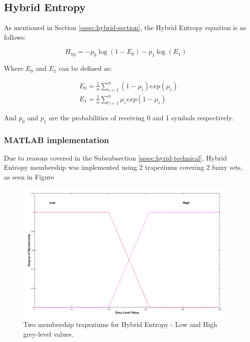 \subsection{Hybrid Entropy}

As mentioned in Section \ref{sssec:hybrid-section}, the Hybrid Entropy equation is as follows:

\begin{equation}
  H_{hy} = -p_0\log(1 - E_0) - p_1\log(E_1)
\end{equation}

Where $E_0$ and $E_1$ can be defined as:

\begin{subequations} \label{eq:E0-E1}
  \begin{align}
    &E_0 = \frac{1}{n}\displaystyle\sum_{i=1}^{n}{(1-\mu_i)exp(\mu_i)} \\
    &E_1 = \frac{1}{n}\displaystyle\sum_{i=1}^{n}{\mu_iexp(1-\mu_i)}
  \end{align}
\end{subequations}

And $p_0$ and $p_1$ are the probabilities of receiving 0 and 1 symbols respectively.

\subsubsection{MATLAB implementation}

Due to reasons covered in the Subsubsection \ref{sssec:hyrid-technical}, Hybrid Entropy membership was implemented using 2 trapeziums covering 2 fuzzy sets, as seen in Figure

\begin{figure}[H]
  \center
  \includegraphics[scale=0.5]{Chapter2/hybrid-img/2_traps.png}
  \caption{Two membership trapeziums for Hybrid Entropy - Low and High grey-level values.}
  \label{fig:2-traps}
\end{figure}

